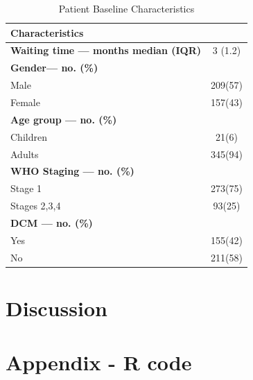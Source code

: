 \documentclass[11pt]{article}
\begin{document}
\begin{table}[H]
	\centering
	\caption{Patient Baseline Characteristics}
	\label{my_table}
	\begin{tabular}{|l|c|} %
		\hline
		Characteristics & \\
		 \hline 
		\textbf{Waiting time — months median (IQR)} & 3 (1.2) \\
		\hline
		\textbf{Gender— no. (\%)} &  \\ 
		Male & 209(57)\\
		Female & 157(43) \\ 
		\hline
		\textbf{Age group — no. (\%)} &  \\
		Children & 21(6) \\
		Adults & 345(94)\\
		\hline
		\textbf{WHO Staging — no. (\%)} &  \\
		Stage 1  &	273(75)\\
		Stages 2,3,4  &	93(25)\\
		\hline
		\textbf{DCM — no. (\%)}  & \\
		Yes & 155(42)\\
		No & 211(58)\\
		\hline
	\end{tabular}
\end{table}



	\section{Discussion}\label{discussion}
	
	
	
	\begin{thebibliography}{9}
		
	\end{thebibliography}
	
	\section*{Appendix - R code}\label{appendix}
	
	
\end{document}
